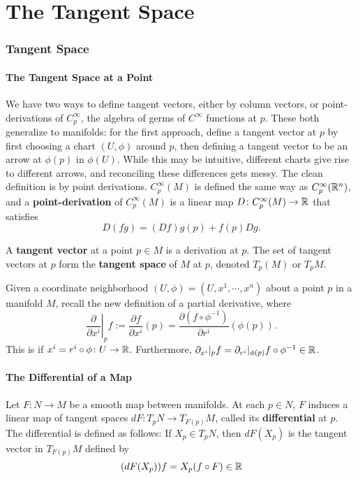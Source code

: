 \part{The Tangent Space}
\section{Tangent Space}
\subsection{The Tangent Space at a Point}
We have two ways to define tangent vectors, either by column vectors, or point-derivations of $C_p^{\infty}$, the algebra of germs of $C^{\infty}$ functions at $p$. These both generalize to manifolds: for the first approach, define a tangent vector at $p$ by first choosing a chart $(U,\phi)$ around $p$, then defining a tangent vector to be an arrow at  $\phi(p)$ in $\phi(U)$. While this may be intuitive, different charts give rise to different arrows, and reconciling these differences gets messy. The clean definition is by point derivations. $C_p^{\infty}(M)$ is defined the same way as $C_p^{\infty}(\mathbb{R}^n )$, and a \textbf{point-derivation} of $C_p^{\infty}(M)$ is a linear map $D \colon C_p^{\infty}(M) \to \mathbb{R}$ that satisfies \[
    D(fg)=(Df)g(p)+f(p)Dg.
\] 

\begin{definition}[]
    A \textbf{tangent vector} at a point $p \in M$ is a derivation at $p$. The set of tangent vectors at $p$ form the \textbf{tangent space} of $M$ at $p$, denoted $T_p(M)$ or $T_pM$.
\end{definition}
Given a coordinate neighborhood $(U,\phi)=(U,x^1,\cdots ,x^n )$ about a point $p$ in a manifold $ M$, recall the new definition of a partial derivative, where \[
    \left. \frac{\partial}{\partial x^i } \right| _p f:= \frac{\partial f}{\partial x^i }(p)= \frac{\partial (f \circ \phi ^{-1})}{\partial r^i }(\phi (p)).
    \] This is if $x^i  = r^i  \circ \phi \colon U \to \mathbb{R}$. Furthermore, $\partial _{x^i }|_p f=\partial _{r^i }|_{\phi(p)}f\circ \phi^{-1} \in \mathbb{R}$.

    \subsection{The Differential of a Map}
    Let $F \colon N \to M$ be a smooth map between manifolds. At each $p \in N$, $F$ induces a linear map of tangent spaces $dF \colon T_p N \to T_{F(p)}M$, called its \textbf{differential} at $p$. The differential is defined as follows: If $X_p \in T_pN$, then $dF(X_p)$ is the tangent vector in $T_{F(p)}M$ defined by \[
        (dF(X_p))f= X_p(f \circ F) \in \mathbb{R}
    \] 

